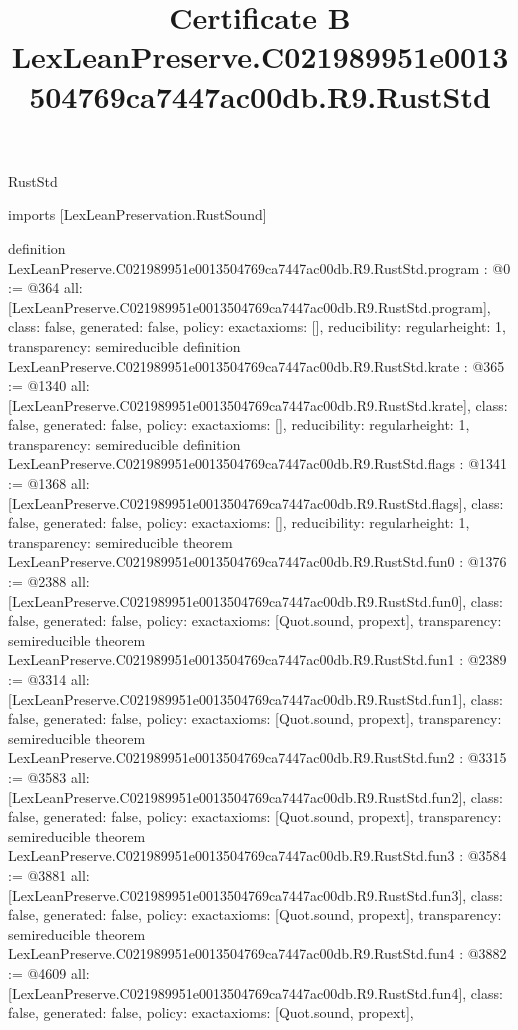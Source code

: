 \begin{lexlean}{RustStd}
\title{Certificate B LexLeanPreserve.C021989951e0013504769ca7447ac00db.R9.RustStd}
\begin{coremodule}
imports [LexLeanPreservation.RustSound]

definition LexLeanPreserve.C021989951e0013504769ca7447ac00db.R9.RustStd.program : @0 := @364 {
  all: [LexLeanPreserve.C021989951e0013504769ca7447ac00db.R9.RustStd.program],
  class: false,
  generated: false,
  policy: exact{axioms: []},
  reducibility: regular{height: 1},
  transparency: semireducible
}
definition LexLeanPreserve.C021989951e0013504769ca7447ac00db.R9.RustStd.krate : @365 := @1340 {
  all: [LexLeanPreserve.C021989951e0013504769ca7447ac00db.R9.RustStd.krate],
  class: false,
  generated: false,
  policy: exact{axioms: []},
  reducibility: regular{height: 1},
  transparency: semireducible
}
definition LexLeanPreserve.C021989951e0013504769ca7447ac00db.R9.RustStd.flags : @1341 := @1368 {
  all: [LexLeanPreserve.C021989951e0013504769ca7447ac00db.R9.RustStd.flags],
  class: false,
  generated: false,
  policy: exact{axioms: []},
  reducibility: regular{height: 1},
  transparency: semireducible
}
theorem LexLeanPreserve.C021989951e0013504769ca7447ac00db.R9.RustStd.fun0 : @1376 := @2388 {
  all: [LexLeanPreserve.C021989951e0013504769ca7447ac00db.R9.RustStd.fun0],
  class: false,
  generated: false,
  policy: exact{axioms: [Quot.sound, propext]},
  transparency: semireducible
}
theorem LexLeanPreserve.C021989951e0013504769ca7447ac00db.R9.RustStd.fun1 : @2389 := @3314 {
  all: [LexLeanPreserve.C021989951e0013504769ca7447ac00db.R9.RustStd.fun1],
  class: false,
  generated: false,
  policy: exact{axioms: [Quot.sound, propext]},
  transparency: semireducible
}
theorem LexLeanPreserve.C021989951e0013504769ca7447ac00db.R9.RustStd.fun2 : @3315 := @3583 {
  all: [LexLeanPreserve.C021989951e0013504769ca7447ac00db.R9.RustStd.fun2],
  class: false,
  generated: false,
  policy: exact{axioms: [Quot.sound, propext]},
  transparency: semireducible
}
theorem LexLeanPreserve.C021989951e0013504769ca7447ac00db.R9.RustStd.fun3 : @3584 := @3881 {
  all: [LexLeanPreserve.C021989951e0013504769ca7447ac00db.R9.RustStd.fun3],
  class: false,
  generated: false,
  policy: exact{axioms: [Quot.sound, propext]},
  transparency: semireducible
}
theorem LexLeanPreserve.C021989951e0013504769ca7447ac00db.R9.RustStd.fun4 : @3882 := @4609 {
  all: [LexLeanPreserve.C021989951e0013504769ca7447ac00db.R9.RustStd.fun4],
  class: false,
  generated: false,
  policy: exact{axioms: [Quot.sound, propext]},
}
\end{coremodule}
\end{lexlean}

